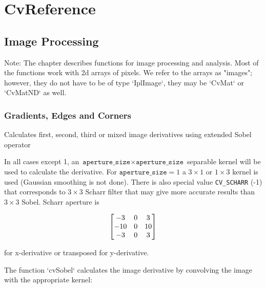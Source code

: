 \chapter{CvReference}
\section{Image Processing}
Note: The chapter describes functions for image processing and analysis. Most of the functions work with 2d arrays of pixels. We refer to the arrays as "images"; however, they do not have to be of type `IplImage`, they may be `CvMat` or `CvMatND` as well.

\subsection{Gradients, Edges and Corners}

\label{Sobel}
\label{Sobel}
Calculates first, second, third or mixed image derivatives using extended Sobel operator

\begin{description}
\end{description}

In all cases except 1, an $\texttt{aperture\_size} \times
\texttt{aperture\_size}$ separable kernel will be used to calculate the
derivative. For $\texttt{aperture\_size} = 1$ a $ 3 \times 1$ or $ 1 \times 3$
kernel is used (Gaussian smoothing is not done). There is also special
value \texttt{CV\_SCHARR} (-1) that corresponds to $3\times3$ Scharr
filter that may give more accurate results than $3\times3$ Sobel. Scharr
aperture is

\[ \begin{bmatrix} -3 & 0 & 3\\ -10 & 0 & 10\\ -3 & 0 & 3 \end{bmatrix}
\]

for x-derivative or transposed for y-derivative.

The function `cvSobel` calculates the image derivative by convolving the image with the appropriate kernel:


